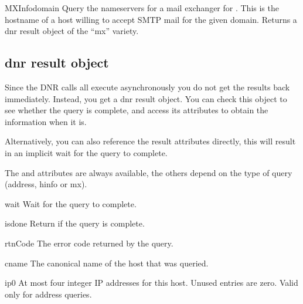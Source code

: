 \begin{funcdesc}{MXInfo}{domain}
Query the nameservers for a mail exchanger for .  This is
the hostname of a host willing to accept SMTP mail for the
given domain.  Returns a dnr result object of the ``mx'' variety.
\end{funcdesc}

\subsection{dnr result object}
\label{dnr-result-object}

Since the DNR calls all execute asynchronously you do not get the
results back immediately.  Instead, you get a dnr result object.  You
can check this object to see whether the query is complete, and access
its attributes to obtain the information when it is.

Alternatively, you can also reference the result attributes directly,
this will result in an implicit wait for the query to complete.

The  and  attributes are always
available, the others depend on the type of query (address, hinfo or
mx).


\begin{methoddesc}{wait}{}
Wait for the query to complete.
\end{methoddesc}

\begin{methoddesc}{isdone}{}
Return  if the query is complete.
\end{methoddesc}


\begin{memberdesc}{rtnCode}
The error code returned by the query.
\end{memberdesc}

\begin{memberdesc}{cname}
The canonical name of the host that was queried.
\end{memberdesc}

\begin{memberdesc}{ip0}
At most four integer IP addresses for this host.  Unused entries are
zero.  Valid only for address queries.
\end{memberdesc}

